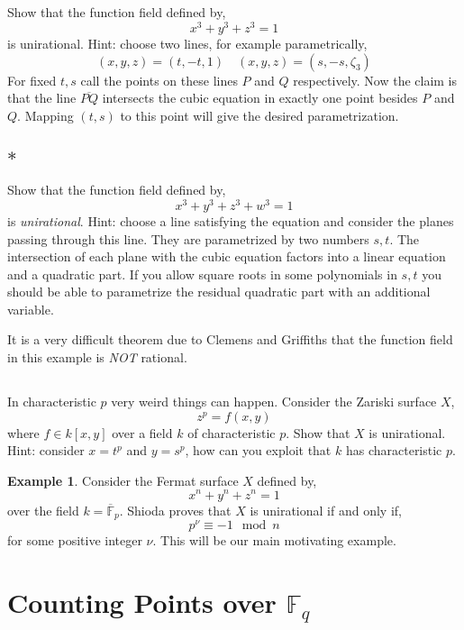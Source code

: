 \documentclass[12pt]{article}
\newcommand{\FF}{\mathbb{F}}
\theoremstyle{remark}
\theoremstyle{definition}
\newtheorem{example}[theorem]{Example}
\begin{document}
\subsection{}
Show that the function field defined by,
\[ x^3 + y^3 + z^3 = 1 \]
is unirational. Hint: choose two lines, for example parametrically,
\[ (x,y,z) = (t,-t,1) \quad (x,y,z) = (s, -s, \zeta_3) \]
For fixed $t,s$ call the points on these lines $P$ and $Q$ respectively. Now the claim is that the line $\overline{PQ}$ intersects the cubic equation in exactly one point besides $P$ and $Q$. Mapping $(t,s)$ to this point will give the desired parametrization. 

\subsection{$\ast$}

Show that the function field defined by,
\[ x^3 + y^3 + z^3 + w^3 = 1 \]
is \textit{unirational}. Hint: choose a line satisfying the equation and consider the planes passing through this line. They are parametrized by two numbers $s,t$. The intersection of each plane with the cubic equation factors into a linear equation and a quadratic part. If you allow square roots in some polynomials in $s,t$ you should be able to parametrize the residual quadratic part with an additional variable. 
\par
It is a very difficult theorem due to Clemens and Griffiths that the function field in this example is \textit{NOT} rational.

\subsection{}

In characteristic $p$ very weird things can happen. Consider the Zariski surface $X$,
\[ z^p = f(x,y) \]
where $f \in k[x,y]$ over a field $k$ of characteristic $p$. Show that $X$ is unirational. Hint: consider $x = t^p$ and $y = s^p$, how can you exploit that $k$ has characteristic $p$.

\begin{example}
Consider the Fermat surface $X$ defined by,
\[ x^n + y^n + z^n = 1 \]
over the field $k = \overline{\FF}_p$. Shioda proves \cite[Theorem III]{shioda_fermat} that $X$ is unirational if and only if,
\[ p^\nu \equiv -1 \mod n \]
for some positive integer $\nu$. This will be our main motivating example.
\end{example}

\section{Counting Points over $\FF_q$}
\end{document}
